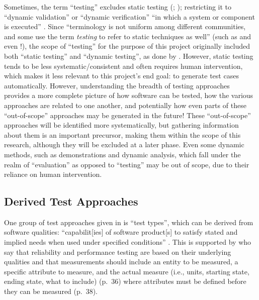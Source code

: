 Sometimes, the term ``testing'' excludes static testing
(\citealp[p.~222]{AmmannAndOffutt2017}; \citealp[p.~13]{Firesmith2015});
restricting it to ``dynamic validation'' \citep[p.~5-1]{SWEBOK2024} or
``dynamic verification'' ``in which a system or component is
executed'' \citep[p.~427]{IEEE2017}. Since ``terminology is not uniform
among different communities, and some use the term \emph{testing} to refer to
static techniques as well''
\citep[p.~5-2]{SWEBOK2024} (such as \citep[pp.~8-9]{Gerrard2000a} and even
\citep[p.~440]{IEEE2017}!), the scope of ``testing'' for the purpose of this
project originally included both ``static testing'' and ``dynamic testing'', as
done by \citet[p.~17]{IEEE2022}. However, static testing tends to be less
systematic/consistent and often requires human intervention, which makes it
less relevant to this project's end goal: to generate test cases automatically.
However, understanding the breadth of testing approaches provides a more
complete picture of how software can be tested, how the various approaches are
related to one another, and potentially how even parts of these ``out-of-scope''
approaches may be generated in the future! These ``out-of-scope'' approaches
will be identified more systematically, but gathering information about them is
an important precursor, making them within the scope of this research, although
they will be excluded at a later phase. Even some dynamic methods, such as
demonstrations and dynamic analysis, which fall under the realm of ``evaluation''
as opposed to ``testing'' \citep[p.~13]{Firesmith2015} may be out of scope, due
to their reliance on human intervention.

\subsection{Derived Test Approaches}
\label{chap:testing:sec:derived-tests}
One group of test approaches given in  is ``test
types'', which can be derived from software qualities: ``capabilit[ies] of
software product[s] to satisfy stated and implied needs when used under
specified conditions'' \citep[p.~424]{IEEE2017} . This
is supported by \citeauthor{FentonAndPfleeger1997} who say that reliability
and performance testing are based on their underlying qualities
\citeyearpar[p.~18]{FentonAndPfleeger1997} and that measurements should include
an entity to be measured, a specific attribute to measure, and the actual
measure (i.e., units, starting state, ending state, what to include) (p.~36)
where attributes must be defined before they can be measured (p.~38).

